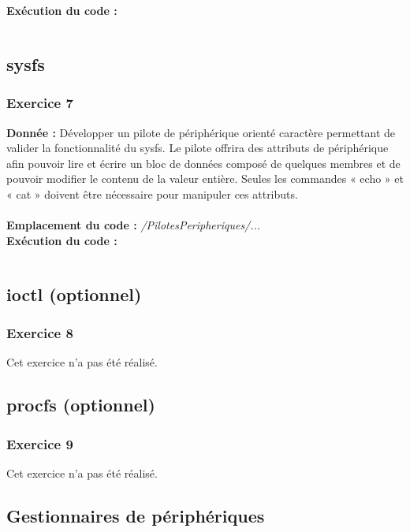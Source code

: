 \textbf{Exécution du code : } \\
\begin{lstlisting}

\end{lstlisting}

\subsection{sysfs}
\subsubsection{Exercice 7}
\textbf{Donnée : } Développer	un	pilote	de	périphérique	orienté	caractère	permettant	de	valider	la	fonctionnalité	du	
sysfs.	Le	pilote		offrira	des	attributs	de	périphérique	afin	pouvoir	lire	et	écrire	un	bloc	de	données	
composé	de	quelques	membres	et	de	pouvoir	modifier	le	contenu	de	la	valeur	entière.	Seules	les	
commandes	« echo » et	« cat » doivent	être	nécessaire	pour	manipuler	ces	attributs.\\\\
\textbf{Emplacement du code : } \textit{/PilotesPeripheriques/...}\\

\textbf{Exécution du code : } \\
\begin{lstlisting}

\end{lstlisting}

\subsection{ioctl (optionnel)}
\subsubsection{Exercice 8}
Cet exercice n'a pas été réalisé.

\subsection{procfs (optionnel)}
\subsubsection{Exercice 9}
Cet exercice n'a pas été réalisé.

\subsection{Gestionnaires de périphériques}
